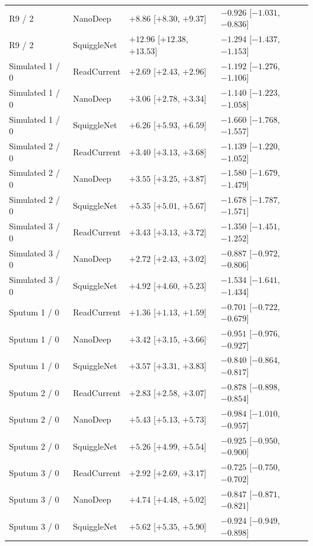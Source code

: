 \begin{longtable}{llll}
R9 / 2 & NanoDeep & $+8.86$ [$+8.30$, $+9.37$] & $-0.926$ [$-1.031$, $-0.836$]\\
R9 / 2 & SquiggleNet & $+12.96$ [$+12.38$, $+13.53$] & $-1.294$ [$-1.437$, $-1.153$]\\
Simulated 1 / 0 & ReadCurrent & $+2.69$ [$+2.43$, $+2.96$] & $-1.192$ [$-1.276$, $-1.106$]\\
Simulated 1 / 0 & NanoDeep & $+3.06$ [$+2.78$, $+3.34$] & $-1.140$ [$-1.223$, $-1.058$]\\
Simulated 1 / 0 & SquiggleNet & $+6.26$ [$+5.93$, $+6.59$] & $-1.660$ [$-1.768$, $-1.557$]\\
Simulated 2 / 0 & ReadCurrent & $+3.40$ [$+3.13$, $+3.68$] & $-1.139$ [$-1.220$, $-1.052$]\\
Simulated 2 / 0 & NanoDeep & $+3.55$ [$+3.25$, $+3.87$] & $-1.580$ [$-1.679$, $-1.479$]\\
Simulated 2 / 0 & SquiggleNet & $+5.35$ [$+5.01$, $+5.67$] & $-1.678$ [$-1.787$, $-1.571$]\\
Simulated 3 / 0 & ReadCurrent & $+3.43$ [$+3.13$, $+3.72$] & $-1.350$ [$-1.451$, $-1.252$]\\
Simulated 3 / 0 & NanoDeep & $+2.72$ [$+2.43$, $+3.02$] & $-0.887$ [$-0.972$, $-0.806$]\\
Simulated 3 / 0 & SquiggleNet & $+4.92$ [$+4.60$, $+5.23$] & $-1.534$ [$-1.641$, $-1.434$]\\
Sputum 1 / 0 & ReadCurrent & $+1.36$ [$+1.13$, $+1.59$] & $-0.701$ [$-0.722$, $-0.679$]\\
Sputum 1 / 0 & NanoDeep & $+3.42$ [$+3.15$, $+3.66$] & $-0.951$ [$-0.976$, $-0.927$]\\
Sputum 1 / 0 & SquiggleNet & $+3.57$ [$+3.31$, $+3.83$] & $-0.840$ [$-0.864$, $-0.817$]\\
Sputum 2 / 0 & ReadCurrent & $+2.83$ [$+2.58$, $+3.07$] & $-0.878$ [$-0.898$, $-0.854$]\\
Sputum 2 / 0 & NanoDeep & $+5.43$ [$+5.13$, $+5.73$] & $-0.984$ [$-1.010$, $-0.957$]\\
Sputum 2 / 0 & SquiggleNet & $+5.26$ [$+4.99$, $+5.54$] & $-0.925$ [$-0.950$, $-0.900$]\\
Sputum 3 / 0 & ReadCurrent & $+2.92$ [$+2.69$, $+3.17$] & $-0.725$ [$-0.750$, $-0.702$]\\
Sputum 3 / 0 & NanoDeep & $+4.74$ [$+4.48$, $+5.02$] & $-0.847$ [$-0.871$, $-0.821$]\\
Sputum 3 / 0 & SquiggleNet & $+5.62$ [$+5.35$, $+5.90$] & $-0.924$ [$-0.949$, $-0.898$]\\
\end{longtable}
